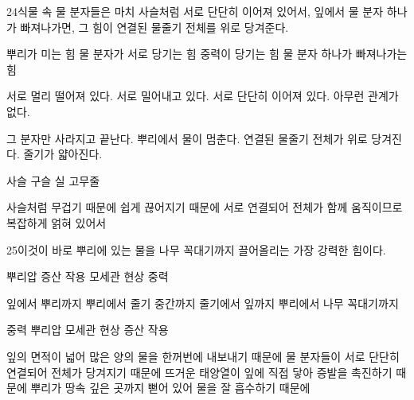 \documentclass[fs85,seriesRus]{korfarm-base}
\begin{document}
\begin{kfSentenceUnit}{24}{식물 속 물 분자들은 마치 사슬처럼 서로 단단히 이어져 있어서, 잎에서 물 분자 하나가 빠져나가면, 그 힘이 연결된 물줄기 전체를 위로 당겨준다.}
\begin{kfChoices}
\kfChoice 뿌리가 미는 힘
\kfChoice 물 분자가 서로 당기는 힘
\kfChoice 중력이 당기는 힘
\kfChoice 물 분자 하나가 빠져나가는 힘
\end{kfChoices}
\begin{kfChoices}
\kfChoice 서로 멀리 떨어져 있다.
\kfChoice 서로 밀어내고 있다.
\kfChoice 서로 단단히 이어져 있다.
\kfChoice 아무런 관계가 없다.
\end{kfChoices}
\begin{kfChoices}
\kfChoice 그 분자만 사라지고 끝난다.
\kfChoice 뿌리에서 물이 멈춘다.
\kfChoice 연결된 물줄기 전체가 위로 당겨진다.
\kfChoice 줄기가 얇아진다.
\end{kfChoices}
\begin{kfChoices}
\kfChoice 사슬
\kfChoice 구슬
\kfChoice 실
\kfChoice 고무줄
\end{kfChoices}
\begin{kfChoices}
\kfChoice 사슬처럼 무겁기 때문에
\kfChoice 쉽게 끊어지기 때문에
\kfChoice 서로 연결되어 전체가 함께 움직이므로
\kfChoice 복잡하게 얽혀 있어서
\end{kfChoices}
\end{kfSentenceUnit}

\begin{kfSentenceUnit}{25}{이것이 바로 뿌리에 있는 물을 나무 꼭대기까지 끌어올리는 가장 강력한 힘이다.}
\begin{kfChoices}
\kfChoice 뿌리압
\kfChoice 증산 작용
\kfChoice 모세관 현상
\kfChoice 중력
\end{kfChoices}
\begin{kfChoices}
\kfChoice 잎에서 뿌리까지
\kfChoice 뿌리에서 줄기 중간까지
\kfChoice 줄기에서 잎까지
\kfChoice 뿌리에서 나무 꼭대기까지
\end{kfChoices}
\begin{kfChoices}
\kfChoice 중력
\kfChoice 뿌리압
\kfChoice 모세관 현상
\kfChoice 증산 작용
\end{kfChoices}
\begin{kfChoices}
\kfChoice 잎의 면적이 넓어 많은 양의 물을 한꺼번에 내보내기 때문에
\kfChoice 물 분자들이 서로 단단히 연결되어 전체가 당겨지기 때문에
\kfChoice 뜨거운 태양열이 잎에 직접 닿아 증발을 촉진하기 때문에
\kfChoice 뿌리가 땅속 깊은 곳까지 뻗어 있어 물을 잘 흡수하기 때문에
\end{kfChoices}
\end{kfSentenceUnit}
\end{document}
